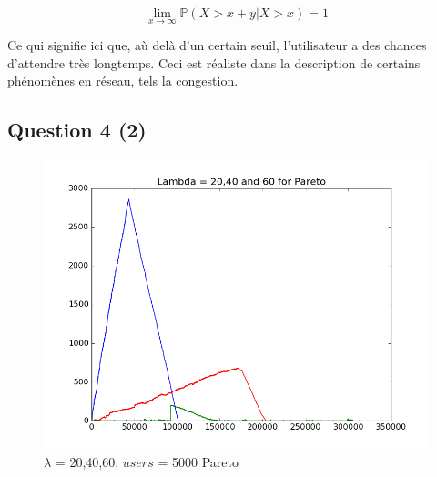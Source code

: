 \documentclass[12pt]{article}
\begin{document}
\[\lim\limits_{x \to  \infty} \mathbb{P}(X > x+y | X > x) = 1\]

Ce qui signifie ici que, aù delà d'un certain seuil, l'utilisateur a des chances d'attendre très longtemps. Ceci est réaliste dans la description de certains phénomènes en réseau, tels la congestion.

\subsection{Question 4 (2)}
\begin{figure}[H]
\centering
\includegraphics[scale=0.50]{3lambdapareto.png}
\caption{\label{fig:rf_taille_noeud} $\lambda$ = 20,40,60, $users$ = 5000 Pareto}
\end{figure}
\end{document}
